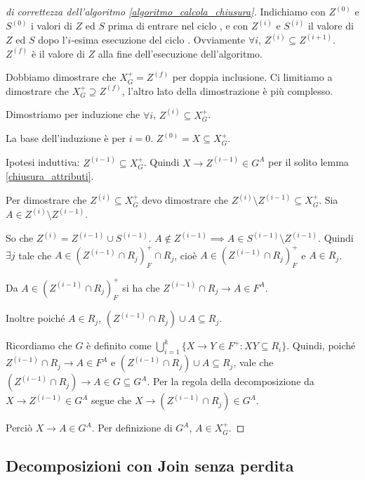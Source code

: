 \begin{proof}[di correttezza dell'algoritmo \ref{algoritmo_calcola_chiusura}]
Indichiamo con $Z^{(0)}$ e $S^{(0)}$ i valori di $Z$ ed $S$ prima di entrare nel ciclo , e con $Z^{(i)}$ e $S^{(i)}$ il valore di $Z$ ed $S$ dopo l'$i$-esima esecuzione del ciclo . Ovviamente $\forall i$, $Z^{(i)} \subseteq Z^{(i+1)}$. $Z^{(f)}$ \`e il valore di $Z$ alla fine dell'esecuzione dell'algoritmo.

Dobbiamo dimostrare che $X^{+}_{G} = Z^{(f)}$ per doppia inclusione. Ci limitiamo a dimostrare che $X^{+}_{G} \supseteq Z^{(f)}$, l'altro lato della dimostrazione \`e pi\`u complesso.

Dimostriamo per induzione che $\forall i$, $Z^{(i)} \subseteq X^{+}_{G}$.

La base dell'induzione \`e per $i = 0$. $Z^{(0)} = X \subseteq X^{+}_{G}$.

Ipotesi induttiva: $Z^{(i-1)} \subseteq X^{+}_{G}$. Quindi $X \to Z^{(i-1)} \in G^A$ per il solito lemma \ref{chiusura_attributi}.

Per dimostrare che $Z^{(i)} \subseteq X^{+}_{G}$ devo dimostrare che $Z^{(i)} \setminus Z^{(i-1)} \subseteq X^{+}_{G}$. Sia $A \in Z^{(i)} \setminus Z^{(i-1)}$. 

So che $Z^{(i)} = Z^{(i-1)} \cup S^{(i-1)}$. $A \notin Z^{(i-1)} \implies A \in S^{(i-1)} \setminus Z^{(i-1)}$. Quindi $\exists j $ tale che $A \in (Z^{(i-1)} \cap R_j)_{F}^{+} \cap R_j$, cio\`e $A \in (Z^{(i-1)} \cap R_j)_{F}^{+}$ e $A \in R_j$. 

Da $A \in (Z^{(i-1)} \cap R_j)_{F}^{+}$ si ha che $Z^{(i-1)} \cap R_j \to A \in F^A$. 

Inoltre poich\'e $A \in R_j$, $(Z^{(i - 1)} \cap R_j) \cup A \subseteq R_j$.

Ricordiamo che $G$ \`e definito come $\bigcup_{i = 1}^{k} \{X \to Y \in F^{+} : X Y \subseteq R_i \}$. Quindi, poich\'e $Z^{(i-1)} \cap R_j \to A \in F^A$ e $(Z^{(i - 1)} \cap R_j) \cup A \subseteq R_j$, vale che $(Z^{(i - 1)} \cap R_j) \to A \in G \subseteq G^A$. Per la regola della decomposizione da $X \to Z^{(i-1)} \in G^A$ segue che $X \to (Z^{(i-1)} \cap R_j) \in G^A$.

Perci\`o $X \to A \in G^A$. Per definizione di $G^A$, $A \in X^{+}_G$.
\end{proof}

\subsection{Decomposizioni con Join senza perdita}

